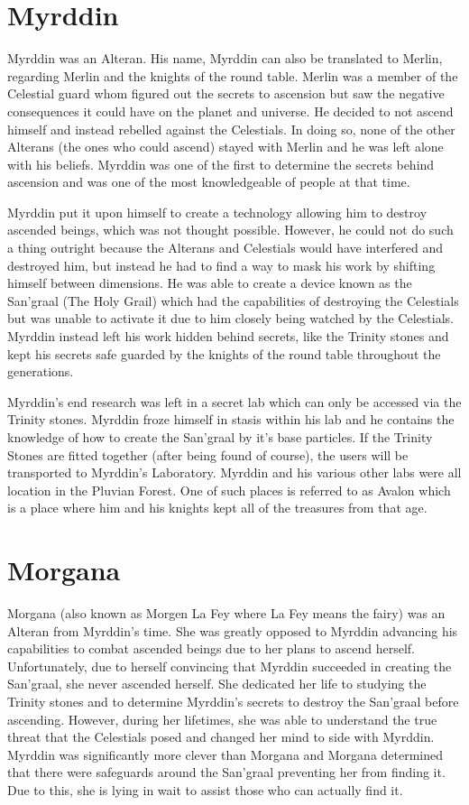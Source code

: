 \section{Myrddin}

Myrddin was an Alteran. His name, Myrddin can also be translated to Merlin, regarding Merlin and the knights of the round table. Merlin was a member of the Celestial guard whom figured out the secrets to ascension but saw the negative consequences it could have on the planet and universe. He decided to not ascend himself and instead rebelled against the Celestials. In doing so, none of the other Alterans (the ones who could ascend) stayed with Merlin and he was left alone with his beliefs. Myrddin was one of the first to determine the secrets behind ascension and was one of the most knowledgeable of people at that time.

Myrddin put it upon himself to create a technology allowing him to destroy ascended beings, which was not thought possible. However, he could not do such a thing outright because the Alterans and Celestials would have interfered and destroyed him, but instead he had to find a way to mask his work by shifting himself between dimensions. He was able to create a device known as the San'graal (The Holy Grail) which had the capabilities of destroying the Celestials but was unable to activate it due to him closely being watched by the Celestials. Myrddin instead left his work hidden behind secrets, like the Trinity stones and kept his secrets safe guarded by the knights of the round table throughout the generations.

Myrddin's end research was left in a secret lab which can only be accessed via the Trinity stones. Myrddin froze himself in stasis within his lab and he contains the knowledge of how to create the San'graal by it's base particles. If the Trinity Stones are fitted together (after being found of course), the users will be transported to Myrddin's Laboratory. Myrddin and his various other labs were all location in the Pluvian Forest. One of such places is referred to as Avalon which is a place where him and his knights kept all of the treasures from that age.

\section{Morgana}

Morgana (also known as Morgen La Fey where La Fey means the fairy) was an Alteran from Myrddin's time. She was greatly opposed to Myrddin advancing his capabilities to combat ascended beings due to her plans to ascend herself. Unfortunately, due to herself convincing that Myrddin succeeded in creating the San'graal, she never ascended herself. She dedicated her life to studying the Trinity stones and to determine Myrddin's secrets to destroy the San'graal before ascending. However, during her lifetimes, she was able to understand the true threat that the Celestials posed and changed her mind to side with Myrddin. Myrddin was significantly more clever than Morgana and Morgana determined that there were safeguards around the San'graal preventing her from finding it. Due to this, she is lying in wait to assist those who can actually find it. 

